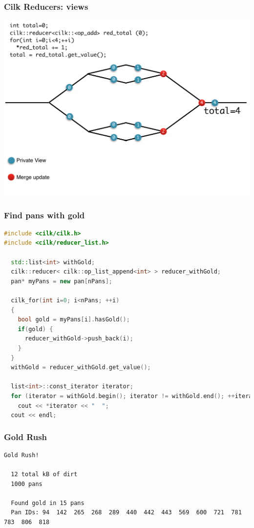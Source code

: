 \documentclass[fleqn,xcolor=table,10pt,final]{beamer}
\begin{document}
\begin{frame}
  \frametitle{Cilk Reducers: views}
  \includegraphics[width=\textwidth]{figures/reduce}
\end{frame}


\begin{frame}[fragile]
  \frametitle{Find pans with gold}
  \begin{lstlisting}[language=C++,basicstyle=\scriptsize]
#include <cilk/cilk.h>
#include <cilk/reducer_list.h>

  std::list<int> withGold;
  cilk::reducer< cilk::op_list_append<int> > reducer_withGold;
  pan* myPans = new pan[nPans];

  cilk_for(int i=0; i<nPans; ++i)
  {
    bool gold = myPans[i].hasGold();
    if(gold) {
      reducer_withGold->push_back(i);
    }
  }
  withGold = reducer_withGold.get_value();

  list<int>::const_iterator iterator;
  for (iterator = withGold.begin(); iterator != withGold.end(); ++iterator)
    cout << *iterator << "  ";
  cout << endl;
  \end{lstlisting}
\end{frame}

\begin{frame}[fragile]
  \frametitle{Gold Rush}
  {\scriptsize
  \begin{verbatim}
Gold Rush!

  12 total kB of dirt
  1000 pans

  Found gold in 15 pans
  Pan IDs: 94  142  265  268  289  440  442  443  569  600  721  781  783  806  818
  \end{verbatim}
}
\end{frame}
\end{document}

